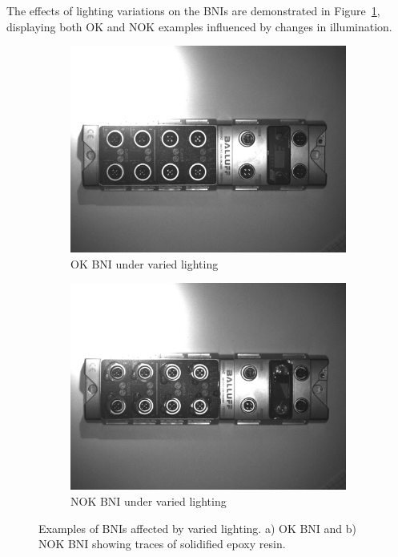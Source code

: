 \documentclass[12pt,DIV14,BCOR12mm,a4paper,footinclude=false,headinclude,parskip=half-,twoside,openright,cleardoublepage=empty,toc=index,bibliography=totoc,listof=totoc]{scrreprt}
\numberwithin{equation}{chapter}
\begin{document}
\begin{enumerate}
	The effects of lighting variations on the BNIs are demonstrated in Figure~\ref{fig:lighting}, displaying both OK and NOK examples influenced by changes in illumination.
    \begin{figure}
        \centering
        \begin{subfigure}[b]{0.45\textwidth}
            \centering
            \includegraphics[scale=0.15]{../media/BNI-influence-lighting-OK.png}
            \caption{OK BNI under varied lighting}
        \end{subfigure}
        \hfill
        \begin{subfigure}[b]{0.45\textwidth}
            \centering
            \includegraphics[scale=0.15]{../media/BNI-influence-lighting-NOK.png}
            \caption{NOK BNI under varied lighting}
        \end{subfigure}
        \caption{Examples of BNIs affected by varied lighting. a) OK BNI and b) NOK BNI showing traces of solidified epoxy resin.}
        \label{fig:lighting}
    \end{figure}


\end{enumerate}
\end{document}

